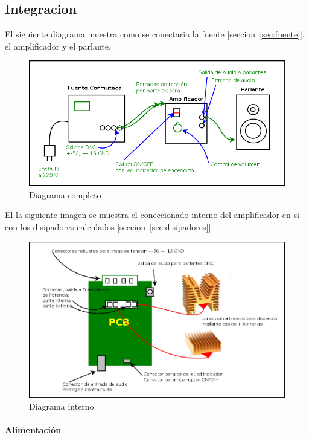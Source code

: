 \documentclass[a4paper,12pt,twoside]{article}
\begin{document}
\subsection{Integracion}

El siguiente diagrama muestra como se conectaria la fuente [seccion~\ref{sec:fuente}], el amplificador y el parlante.

\begin{figure}[H]
\centering
\includegraphics[width=1\textwidth]{img/integracion/diagrama_completo}
\caption{Diagrama completo}
\label{fig:diag_completo} 
\end{figure}

El la siguiente imagen se muestra el coneccionado interno del amplificador en si con los disipadores calculados [seccion~\ref{sec:disipadores}].

\begin{figure}[H]
\centering
\includegraphics[width=1\textwidth]{img/integracion/diagrama_interno}
\caption{Diagrama interno}
\label{fig:circuito} 
\end{figure}



\paragraph{Alimentación}
\end{document}
